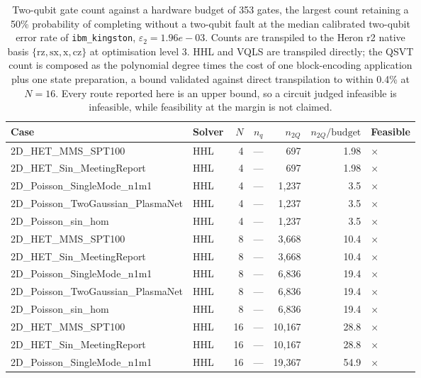\begin{table}[htbp]
  \centering
  \caption{Two-qubit gate count against a hardware budget of 353 gates, the largest count retaining a 50\% probability of completing without a two-qubit fault at the median calibrated two-qubit error rate of \texttt{ibm\_kingston}, $\varepsilon_2 = 1.96e-03$. Counts are transpiled to the Heron r2 native basis $\{\mathrm{rz}, \mathrm{sx}, \mathrm{x}, \mathrm{cz}\}$ at optimisation level 3. HHL and VQLS are transpiled directly; the QSVT count is composed as the polynomial degree times the cost of one block-encoding application plus one state preparation, a bound validated against direct transpilation to within 0.4\% at $N=16$. Every route reported here is an upper bound, so a circuit judged infeasible is infeasible, while feasibility at the margin is not claimed.}
  \label{tab:hardware_feasibility}
  \begin{tabular}{llrrrrl}
    \toprule
    Case & Solver & $N$ & $n_q$ & $n_{2Q}$ & $n_{2Q}/\mathrm{budget}$ & Feasible \\
    \midrule
    2D\_HET\_MMS\_SPT100 & HHL & 4 & --- & 697 & 1.98 & $\times$ \\
    2D\_HET\_Sin\_MeetingReport & HHL & 4 & --- & 697 & 1.98 & $\times$ \\
    2D\_Poisson\_SingleMode\_n1m1 & HHL & 4 & --- & 1,237 & 3.5 & $\times$ \\
    2D\_Poisson\_TwoGaussian\_PlasmaNet & HHL & 4 & --- & 1,237 & 3.5 & $\times$ \\
    2D\_Poisson\_sin\_hom & HHL & 4 & --- & 1,237 & 3.5 & $\times$ \\
    2D\_HET\_MMS\_SPT100 & HHL & 8 & --- & 3,668 & 10.4 & $\times$ \\
    2D\_HET\_Sin\_MeetingReport & HHL & 8 & --- & 3,668 & 10.4 & $\times$ \\
    2D\_Poisson\_SingleMode\_n1m1 & HHL & 8 & --- & 6,836 & 19.4 & $\times$ \\
    2D\_Poisson\_TwoGaussian\_PlasmaNet & HHL & 8 & --- & 6,836 & 19.4 & $\times$ \\
    2D\_Poisson\_sin\_hom & HHL & 8 & --- & 6,836 & 19.4 & $\times$ \\
    2D\_HET\_MMS\_SPT100 & HHL & 16 & --- & 10,167 & 28.8 & $\times$ \\
    2D\_HET\_Sin\_MeetingReport & HHL & 16 & --- & 10,167 & 28.8 & $\times$ \\
    2D\_Poisson\_SingleMode\_n1m1 & HHL & 16 & --- & 19,367 & 54.9 & $\times$ \\

\end{tabular}
\end{table}
